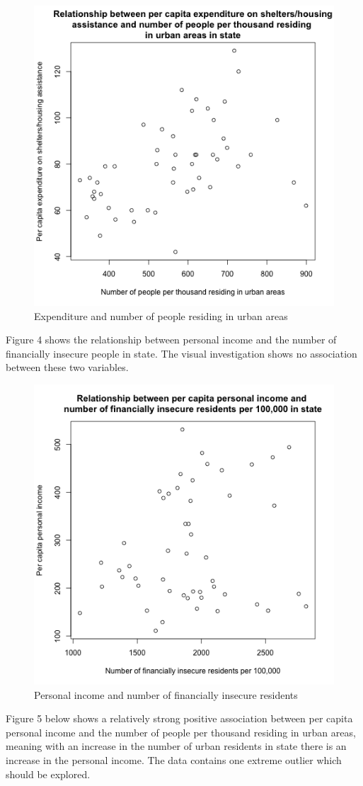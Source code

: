 \documentclass[12pt,letterpaper]{article}
\begin{document}
\begin{figure}[h!]\centering
	\caption{\footnotesize Expenditure and number of people residing in urban areas}
	\label{fig:plot_3}
	\includegraphics[width=.5\textwidth]{scatterplot_y_x3.png}
\end{figure}

\noindent Figure 4 shows the relationship between personal income and the number of financially insecure people in state. The visual investigation shows no association between these two variables. \\

\begin{figure}[h!]\centering
	\caption{\footnotesize Personal income and number of financially insecure residents}
	\label{fig:plot_4}
	\includegraphics[width=.5\textwidth]{scatterplot_x1_x2.png}
\end{figure}

\noindent Figure 5 below shows a relatively strong positive association between per capita personal income and the number of people per thousand residing in urban areas, meaning with an increase in the number of urban residents in state there is an increase in the personal income. The data contains one extreme outlier which should be explored.  \\
\pagebreak
\end{document}
